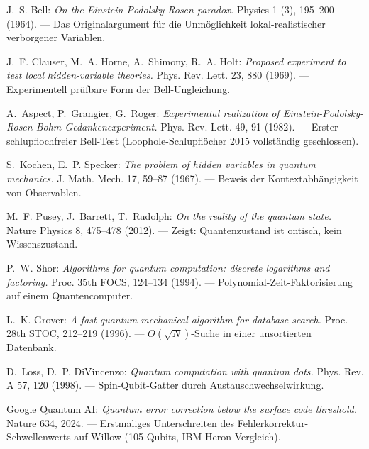 \begin{description}[leftmargin=3.5em,style=sameline,itemsep=0.4em]\small

\item[Bell 1964] J.~S. Bell: \textit{On the Einstein-Podolsky-Rosen
  paradox.} Physics 1 (3), 195–200 (1964). — Das Originalargument
  für die Unmöglichkeit lokal-realistischer verborgener Variablen.

\item[CHSH 1969] J.~F. Clauser, M.~A. Horne, A.~Shimony, R.~A. Holt:
  \textit{Proposed experiment to test local hidden-variable theories.}
  Phys. Rev. Lett. 23, 880 (1969). — Experimentell prüfbare Form der
  Bell-Ungleichung.

\item[Aspect 1982] A.~Aspect, P.~Grangier, G.~Roger: \textit{Experimental
  realization of Einstein-Podolsky-Rosen-Bohm Gedankenexperiment.}
  Phys. Rev. Lett. 49, 91 (1982). — Erster schlupflochfreier
  Bell-Test (Loophole-Schlupflöcher 2015 vollständig geschlossen).

\item[Kochen/Specker 1967] S.~Kochen, E.~P. Specker: \textit{The
  problem of hidden variables in quantum mechanics.} J. Math. Mech.
  17, 59–87 (1967). — Beweis der Kontextabhängigkeit von Observablen.

\item[PBR 2012] M.~F. Pusey, J.~Barrett, T.~Rudolph: \textit{On the
  reality of the quantum state.} Nature Physics 8, 475–478 (2012). —
  Zeigt: Quantenzustand ist ontisch, kein Wissenszustand.

\item[Shor 1994] P.~W. Shor: \textit{Algorithms for quantum computation:
  discrete logarithms and factoring.} Proc. 35th FOCS, 124–134 (1994). —
  Polynomial-Zeit-Faktorisierung auf einem Quantencomputer.

\item[Grover 1996] L.~K. Grover: \textit{A fast quantum mechanical
  algorithm for database search.} Proc. 28th STOC, 212–219 (1996). —
  $O(\sqrt N)$-Suche in einer unsortierten Datenbank.

\item[Loss/DiVincenzo 1998] D.~Loss, D.~P. DiVincenzo: \textit{Quantum
  computation with quantum dots.} Phys. Rev. A 57, 120 (1998). —
  Spin-Qubit-Gatter durch Austauschwechselwirkung.

\item[Willow 2024] Google Quantum AI: \textit{Quantum error correction
  below the surface code threshold.} Nature 634, 2024. — Erstmaliges
  Unterschreiten des Fehlerkorrektur-Schwellenwerts auf Willow
  (105 Qubits, IBM-Heron-Vergleich).


\end{description}
